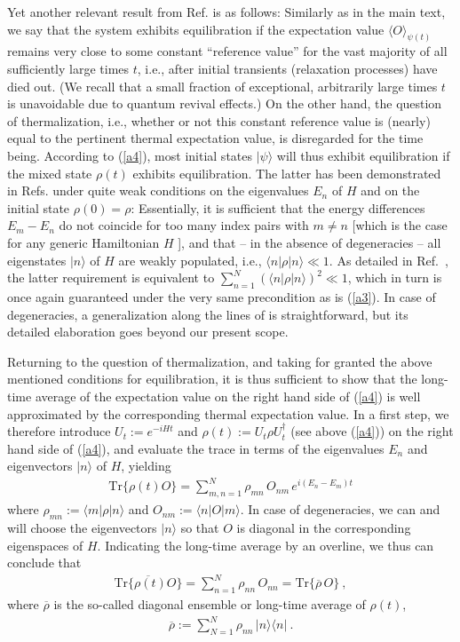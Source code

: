 \documentclass[twocolumn,aps,prb,floatfix,superscriptaddress]{revtex4-2}
\newcommand{\<}{\left\langle}	%
\renewcommand{\>}{\right\rangle}	%
\newcommand{\tr}{\mbox{Tr}}
\begin{document}
Yet another relevant result from
Ref. \cite{rei20} is as follows:
Similarly as in the main text, 
we say that the system exhibits 
equilibration if the expectation value
$\langle O\rangle_{\! \psi(t)}$
remains very close to some constant 
``reference value'' 
for the vast majority of all sufficiently 
large times $t$, i.e., 
after initial transients 
(relaxation processes) 
have died out.
(We recall that a small fraction of exceptional,
arbitrarily large times $t$ is unavoidable due to 
quantum revival effects.)
On the other hand, the question of thermalization, 
i.e., whether or not this constant reference value 
is (nearly) equal to the pertinent thermal 
expectation value, 
is disregarded for the time being.
According to (\ref{a4}), most initial
states $|\psi\rangle$ will thus exhibit 
equilibration if the mixed state
$\rho(t)$ exhibits equilibration.
The latter has been demonstrated 
in Refs. \cite{equil}
under quite weak conditions on the 
eigenvalues $E_n$
of $H$ and on the initial state 
$\rho(0)=\rho$:
Essentially, it is sufficient that
the energy differences $E_m-E_n$
do not coincide for too many
index pairs with $m\not= n$
[which is the case for any generic 
Hamiltonian $H$ \cite{sre99,tas98,equil}],
and that -- in the absence of degeneracies --
all eigenstates $|n\rangle$  
of $H$ are weakly populated,
i.e., $\langle n|\rho|n\rangle\ll 1$.
As detailed in Ref.~\cite{rei20},
the latter requirement is equivalent to 
$\sum_{n=1}^N(\langle n|\rho|n\rangle)^2 \ll 1$,
which in turn is once again guaranteed
under the very same precondition as is 
(\ref{a3}). 
In case of degeneracies, a generalization along the
lines of \cite{equil} is straightforward, but its detailed
elaboration goes beyond our present scope.

Returning to the question of thermalization,
and taking  for granted the above mentioned 
conditions for equilibration, it is thus sufficient to
show that the long-time average of the expectation
value on the right hand side of (\ref{a4}) is well 
approximated by the corresponding thermal 
expectation value.
In a first step, we therefore introduce 
$U_t:=e^{-iHt}$ and $\rho(t):=U_t\rho U_t^\dagger$
(see above (\ref{a4})) on the right
hand side of (\ref{a4}), and evaluate
the trace in terms of the eigenvalues $E_n$ and
eigenvectors $|n\rangle$ of $H$,
yielding
\begin{eqnarray}
\tr\{\rho(t) O\}
=
\sum_{m,n=1}^N \rho_{mn}\, O_{nm}\, e^{i(E_n-E_m)t}
\label{a6}
\end{eqnarray}
where $\rho_{mn}:=\langle m| \rho|n\rangle$ and 
$O_{nm}:=\langle n| O |m\rangle$.
In case of degeneracies, we can and will choose 
the eigenvectors $|n\rangle$ so that $O$ is 
diagonal in the corresponding eigenspaces 
of $H$.
Indicating the long-time average by an overline,
we thus can conclude that
\begin{eqnarray}
\overline{\tr\{\rho(t) O\}}
=
\sum_{n=1}^N \rho_{nn}\, O_{nn}
=\tr\{\overline{\rho}\,O\}
\ ,
\label{a7}
\end{eqnarray}
where $\overline{\rho}$ is the so-called diagonal ensemble 
or long-time average of $\rho(t)$,
\begin{eqnarray}
\overline{\rho} := \sum_{N=1}^N\rho_{nn}\, |n\rangle\langle n|
\ .
\label{a8}
\end{eqnarray}
\end{document}
